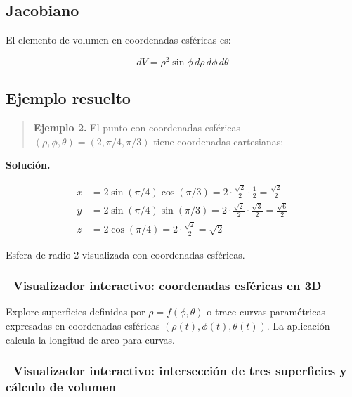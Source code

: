 \documentclass[
]{book}
\begin{document}
\subsection{Jacobiano}\label{jacobiano-1}

El elemento de volumen en coordenadas esféricas es:

\[
dV = \rho^2 \sin\phi \, d\rho \, d\phi \, d\theta
\]

\subsection{Ejemplo resuelto}\label{ejemplo-resuelto-6}

\begin{quote}
\textbf{Ejemplo 2.} El punto con coordenadas esféricas \((\rho, \phi, \theta) = (2, \pi/4, \pi/3)\) tiene coordenadas cartesianas:
\end{quote}

\textbf{Solución.}

\[
\begin{aligned}
x &= 2 \sin(\pi/4) \cos(\pi/3) = 2 \cdot \frac{\sqrt{2}}{2} \cdot \frac{1}{2} = \frac{\sqrt{2}}{2} \\
y &= 2 \sin(\pi/4) \sin(\pi/3) = 2 \cdot \frac{\sqrt{2}}{2} \cdot \frac{\sqrt{3}}{2} = \frac{\sqrt{6}}{2} \\
z &= 2 \cos(\pi/4) = 2 \cdot \frac{\sqrt{2}}{2} = \sqrt{2}
\end{aligned}
\]

\label{fig:esfera-coord}Esfera de radio 2 visualizada con coordenadas esféricas.

\subsubsection{🧮 Visualizador interactivo: coordenadas esféricas en 3D}\label{visualizador-interactivo-coordenadas-esfuxe9ricas-en-3d}

Explore superficies definidas por \(\rho = f(\phi, \theta)\) o trace curvas paramétricas expresadas en coordenadas esféricas \((\rho(t), \phi(t), \theta(t))\). La aplicación calcula la longitud de arco para curvas.

\subsubsection{🧮 Visualizador interactivo: intersección de tres superficies y cálculo de volumen}\label{visualizador-interactivo-intersecciuxf3n-de-tres-superficies-y-cuxe1lculo-de-volumen}
\end{document}
